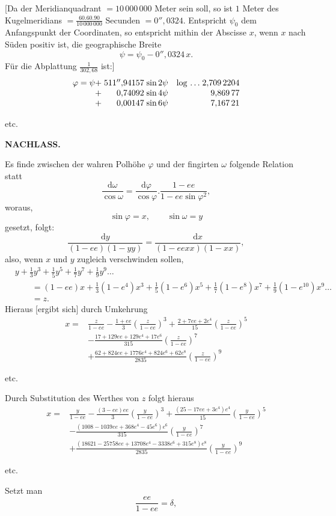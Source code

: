 [Da der Meridianquadrant \(=10\,000\,000\) Meter sein soll, so ist \(1\) Meter des Kugelmeridians \(=\frac{60.60.90}{10\,000\,000}\) Secunden \(=0''{,}0324\). Entspricht \(\psi_0\) dem Anfangspunkt der Coordinaten, so entspricht mithin der Abscisse \(x\), wenn \(x\) nach Süden positiv ist, die geographische Breite
\[\psi=\psi_0-0''{,}0324\,x.\]
Für die Abplattung \(\frac1{302{,}68}\) ist:]
\[
\begin{array}{@{}r@{\;}r@{\;}l@{\quad}l@{\;}r@{}}
\varphi=\psi+&511''{,}94157&\sin2\psi&\log\,.\,.\,.&2{,}709\,2204\\
+&0{,}74092&\sin4\psi&&9{,}869\,77\\
+&0{,}00147&\sin6\psi&&7{,}167\,21
\end{array}
\]
{\centering etc.\par}

\par\clearpage
{}\hfill{\small\textbf{NACHLASS.}}\hfill\null\par\medskip
{\centering [23.]\par}
Es finde zwischen der wahren Polhöhe \(\varphi\) und der fingirten \(\omega\) folgende Relation statt
\[
\frac{\mathrm d\omega}{\cos\omega}=\frac{\mathrm d\varphi}{\cos\varphi}.\frac{1-ee}{1-ee\sin\varphi^2},
\]
\noindent woraus,
\[\sin\varphi=x,\qquad\sin\omega=y\]
\noindent gesetzt, folgt:
\[
\frac{\mathrm dy}{(1-ee)(1-yy)}=\frac{\mathrm dx}{(1-eexx)(1-xx)},
\]
\noindent also, wenn \(x\) und \(y\) zugleich verschwinden sollen,
\[
\begin{aligned}
&y+\tfrac13y^3+\tfrac15y^5+\tfrac17y^7+\tfrac19y^9\ldots\\
&\qquad=(1-ee)x+\tfrac13(1-e^4)x^3+\tfrac15(1-e^6)x^5+\tfrac17(1-e^8)x^7+\tfrac19(1-e^{10})x^9\ldots\\
&\qquad=z.
\end{aligned}
\]
Hieraus [ergibt sich] durch Umkehrung
\[
\begin{aligned}
x={}&\frac{z}{1-ee}-\frac{1+ee}{3}\left(\frac{z}{1-ee}\right)^3+\frac{2+7ee+2e^4}{15}\left(\frac{z}{1-ee}\right)^5\\
&-\frac{17+129ee+129e^4+17e^6}{315}\left(\frac{z}{1-ee}\right)^7\\
&+\frac{62+824ee+1776e^4+824e^6+62e^8}{2835}\left(\frac{z}{1-ee}\right)^9
\end{aligned}
\]
{\centering etc.\par}
Durch Substitution des Werthes von \(z\) folgt hieraus
\[
\begin{aligned}
x={}&\frac{y}{1-ee}-\frac{(3-ee)ee}{3}\left(\frac{y}{1-ee}\right)^3+\frac{(25-17ee+3e^4)e^4}{15}\left(\frac{y}{1-ee}\right)^5\\
&-\frac{(1008-1039ee+368e^4-45e^6)e^6}{315}\left(\frac{y}{1-ee}\right)^7\\
&+\frac{(18621-25758ee+13708e^4-3338e^6+315e^8)e^8}{2835}\left(\frac{y}{1-ee}\right)^9
\end{aligned}
\]
{\centering etc.\par}
Setzt man
\[\frac{ee}{1-ee}=\delta,\]

